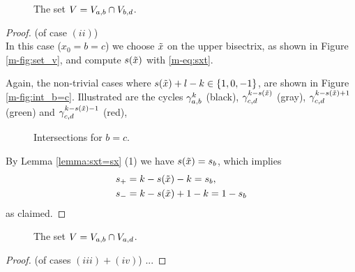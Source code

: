 \documentclass[main.tex]{subfiles}
\begin{document}
    \begin{figure}[H]
      \begin{center}
   
      \end{center}
    \caption{The set $V = V_{a,b} \cap V_{b,d}$.}
    \label{fig:set_v}
\end{figure}
   
   \begin{proof}\let\qed\relax (of case $(ii)$) \\
   In this case ($x_0 = b = c$) we choose $\tilde{x}$ on the upper bisectrix, as shown in Figure \ref{m-fig:set_v}, 
   and compute $s(\tilde{x})$ with \eqref{m-eq:sxt}.
   
   Again, the non-trivial cases where $s(\tilde{x}) + l - k \in \{1,0,-1\}$, are shown in Figure \ref{m-fig:int_b=c}.
   Illustrated are the cycles $\gamma_{a,b}^k$ (black), $\gamma_{c,d}^{k-s(\tilde{x})}$ (gray), $\gamma_{c,d}^{k-s(\tilde{x}) + 1 }$ (green) and
    $\gamma_{c,d}^{k-s(\tilde{x})-1}$ (red),
    \begin{figure}[H]
      \begin{center}
   
      \end{center}
    \caption{Intersections for $b=c$.}
    \label{fig:int_b=c}
   \end{figure}
    By Lemma \ref{lemma:sxt=sx} (1) we have $s(\tilde{x}) = s_b$, which implies
    \begin{align*}
    & s_+ = k-s(\tilde{x})-k = s_b, \\
    & s_- = k-s(\tilde{x})+1-k = 1-s_b
    \end{align*}
  as claimed.
  \end{proof}
 
 \begin{figure}[H]
      \begin{center}
   
      \end{center}
    \caption{The set $V = V_{a,b} \cap V_{a,d}$.}
    \label{fig:set_v}
\end{figure}
   
 
 
 \begin{proof}(of cases $(iii) + (iv)$)
  \todo ...
 \end{proof}

 
  
\end{document}
